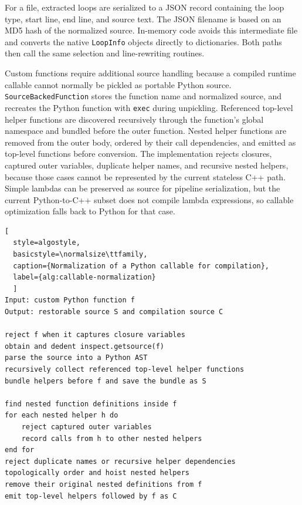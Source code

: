 \documentclass[12pt,a4paper,oneside]{report}
\begin{document}
For a file, extracted loops are serialized to a JSON record containing the loop
type, start line, end line, and source text. The JSON filename is based on an MD5
hash of the normalized source. In-memory code avoids this intermediate file and
converts the native \texttt{LoopInfo} objects directly to dictionaries. Both
paths then call the same selection and line-rewriting routines.

Custom functions require additional source handling because a compiled runtime
callable cannot normally be pickled as portable Python source.
\texttt{SourceBackedFunction} stores the function name and normalized source,
and recreates the Python function with \texttt{exec} during unpickling. Referenced
top-level helper functions are discovered recursively through the function's
global namespace and bundled before the outer function. Nested helper functions
are removed from the outer body, ordered by their call dependencies, and emitted
as top-level functions before conversion. The implementation rejects closures,
captured outer variables, duplicate helper names, and recursive nested helpers,
because those cases cannot be represented by the current stateless C++ path.
Simple lambdas can be preserved as source for pipeline serialization, but the
current Python-to-C++ subset does not compile lambda expressions, so callable
optimization falls back to Python for that case.

\noindent\begin{minipage}{\textwidth}
\begin{lstlisting}[
  style=algostyle,
  basicstyle=\normalsize\ttfamily,
  caption={Normalization of a Python callable for compilation},
  label={alg:callable-normalization}
  ]
Input: custom Python function f
Output: restorable source S and compilation source C

reject f when it captures closure variables
obtain and dedent inspect.getsource(f)
parse the source into a Python AST
recursively collect referenced top-level helper functions
bundle helpers before f and save the bundle as S

find nested function definitions inside f
for each nested helper h do
    reject captured outer variables
    record calls from h to other nested helpers
end for
reject duplicate names or recursive helper dependencies
topologically order and hoist nested helpers
remove their original nested definitions from f
emit top-level helpers followed by f as C
\end{lstlisting}
\end{minipage}
\end{document}
